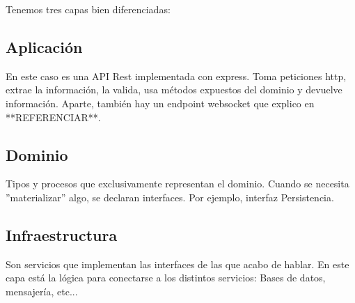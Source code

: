 Tenemos tres capas bien diferenciadas:
\subsection{Aplicación}
En este caso es una API Rest implementada con express. Toma peticiones http, extrae la información, la valida, usa métodos expuestos del dominio y devuelve información.
Aparte, también hay un endpoint websocket que explico en **REFERENCIAR**.
\subsection{Dominio}
Tipos y procesos que exclusivamente representan el dominio.
Cuando se necesita ''materializar'' algo, se declaran interfaces. Por ejemplo, interfaz Persistencia.
\subsection{Infraestructura} 
Son servicios que implementan las interfaces de las que acabo de hablar.
En este capa está la lógica para conectarse a los distintos servicios: Bases de datos, mensajería, etc...

